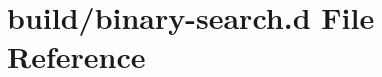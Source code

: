 \hypertarget{binary-search_8d}{}\section{build/binary-\/search.d File Reference}
\label{binary-search_8d}

